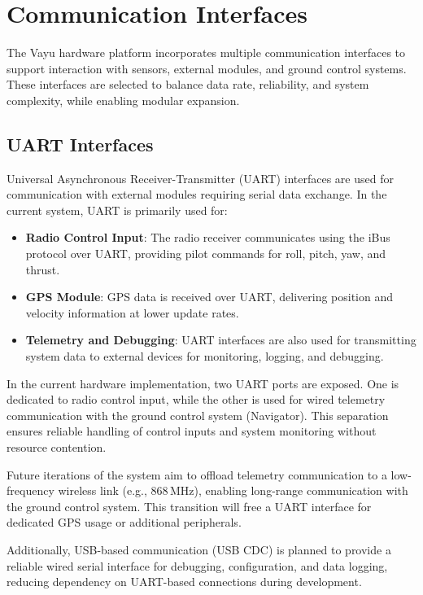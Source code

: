 \section{Communication Interfaces}
\label{sec:hw_comm}

The Vayu hardware platform incorporates multiple communication interfaces to support interaction with sensors, external modules, and ground control systems. These interfaces are selected to balance data rate, reliability, and system complexity, while enabling modular expansion.

\subsection{UART Interfaces}

Universal Asynchronous Receiver-Transmitter (UART) interfaces are used for communication with external modules requiring serial data exchange. In the current system, UART is primarily used for:

\begin{itemize}
    \item \textbf{Radio Control Input}:  
    The radio receiver communicates using the iBus protocol over UART, providing pilot commands for roll, pitch, yaw, and thrust.

    \item \textbf{GPS Module}:  
    GPS data is received over UART, delivering position and velocity information at lower update rates.

    \item \textbf{Telemetry and Debugging}:  
    UART interfaces are also used for transmitting system data to external devices for monitoring, logging, and debugging.
\end{itemize}

In the current hardware implementation, two UART ports are exposed. One is dedicated to radio control input, while the other is used for wired telemetry communication with the ground control system (Navigator). This separation ensures reliable handling of control inputs and system monitoring without resource contention.

Future iterations of the system aim to offload telemetry communication to a low-frequency wireless link (e.g., 868\,MHz), enabling long-range communication with the ground control system. This transition will free a UART interface for dedicated GPS usage or additional peripherals.

Additionally, USB-based communication (USB CDC) is planned to provide a reliable wired serial interface for debugging, configuration, and data logging, reducing dependency on UART-based connections during development.

